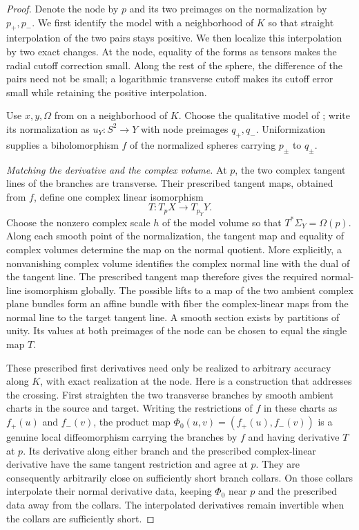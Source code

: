 \begin{proof}
Denote the node by $p$ and its two preimages on the normalization by
$p_+,p_-$.  We first identify the model with a neighborhood of $K$
so that straight interpolation of the two pairs stays positive.
We then localize this interpolation by two exact changes.  At the node,
equality of the forms as tensors makes the radial cutoff correction small.  Along
the rest of the sphere, the difference of the pairs need not be small;
a logarithmic transverse cutoff makes its cutoff error small while
retaining the positive interpolation.

Use $x,y,\Omega$ from
 on a neighborhood of $K$.
Choose the qualitative model of ; write its
normalization as $u_Y:S^2\to Y$ with node preimages $q_+,q_-$.
Uniformization supplies a biholomorphism $f$ of the normalized
spheres carrying $p_\pm$ to $q_\pm$.

\emph{Matching the derivative and the complex volume.}
At $p$, the two complex tangent lines of the branches are transverse.
Their prescribed tangent maps, obtained from $f$, define one complex
linear isomorphism
\[
 T:T_pX\longrightarrow T_{p_Y}Y.
\]
Choose the nonzero complex scale $h$ of the model volume so that
$T^*\Sigma_Y=\Omega(p)$.  Along each smooth point of the
normalization, the tangent map and equality of complex volumes
determine the map on the normal quotient.  More explicitly, a
nonvanishing complex volume identifies the complex normal line with
the dual of the tangent line.  The prescribed tangent map therefore
gives the required normal-line isomorphism globally.  The possible
lifts to a map of the two ambient complex plane bundles form an
affine bundle with fiber the complex-linear maps from the normal
line to the target tangent line.  A smooth section exists by
partitions of unity.  Its values at both preimages of the node can
be chosen to equal the single map $T$.

These prescribed first derivatives need only be realized to arbitrary
accuracy along $K$, with exact realization at the node.  Here is a
construction that addresses the crossing.  First straighten the two
transverse branches by smooth ambient charts in the source and target.
Writing the restrictions of $f$ in these charts as $f_+(u)$ and
$f_-(v)$, the product map
$\Phi_0(u,v)=(f_+(u),f_-(v))$ is a genuine local diffeomorphism
carrying the branches by $f$ and having derivative $T$ at $p$.
Its derivative along either branch
and the prescribed complex-linear derivative have the same tangent
restriction and agree at $p$.  They are consequently arbitrarily
close on sufficiently short branch collars.  On those collars
interpolate their normal derivative data, keeping $\Phi_0$ near
$p$ and the prescribed data away from the collars.  The interpolated
derivatives remain invertible when the collars are sufficiently
short.


\end{proof}
